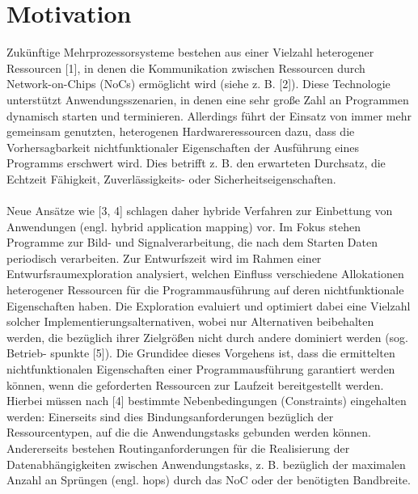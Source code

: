 \chapter{Motivation}\label{motivation}
Zukünftige Mehrprozessorsysteme bestehen aus einer Vielzahl heterogener
Ressourcen [1], in denen die Kommunikation zwischen Ressourcen
durch Network-on-Chips (NoCs) ermöglicht wird (siehe z. B. [2]). Diese Technologie
unterstützt Anwendungsszenarien, in denen eine sehr große Zahl an Programmen
dynamisch starten und terminieren. Allerdings führt der Einsatz von
immer mehr gemeinsam genutzten, heterogenen Hardwareressourcen dazu, dass
die Vorhersagbarkeit nichtfunktionaler Eigenschaften der Ausführung eines Programms
erschwert wird. Dies betrifft z. B. den erwarteten Durchsatz, die Echtzeit
Fähigkeit, Zuverlässigkeits- oder Sicherheitseigenschaften.\\
\\
Neue Ansätze wie [3, 4] schlagen daher hybride Verfahren zur Einbettung von
Anwendungen (engl. hybrid application mapping) vor. Im Fokus stehen Programme
zur Bild- und Signalverarbeitung, die nach dem Starten Daten periodisch
verarbeiten. Zur Entwurfszeit wird im Rahmen einer Entwurfsraumexploration analysiert, welchen Einfluss verschiedene Allokationen heterogener
Ressourcen für die Programmausführung auf deren nichtfunktionale Eigenschaften
haben. Die Exploration evaluiert und optimiert dabei eine Vielzahl solcher
Implementierungsalternativen, wobei nur Alternativen beibehalten werden, die
bezüglich ihrer Zielgrößen nicht durch andere dominiert werden (sog. Betrieb-
spunkte [5]). Die Grundidee dieses Vorgehens ist, dass die ermittelten nichtfunktionalen
Eigenschaften einer Programmausführung garantiert werden können,
wenn die geforderten Ressourcen zur Laufzeit bereitgestellt werden. Hierbei
müssen nach [4] bestimmte Nebenbedingungen (Constraints) eingehalten werden:
Einerseits sind dies Bindungsanforderungen bezüglich der Ressourcentypen,
auf die die Anwendungstasks gebunden werden können. Andererseits bestehen
Routinganforderungen für die Realisierung der Datenabhängigkeiten zwischen
Anwendungstasks, z. B. bezüglich der maximalen Anzahl an Sprüngen (engl.
hops) durch das NoC oder der benötigten Bandbreite.
